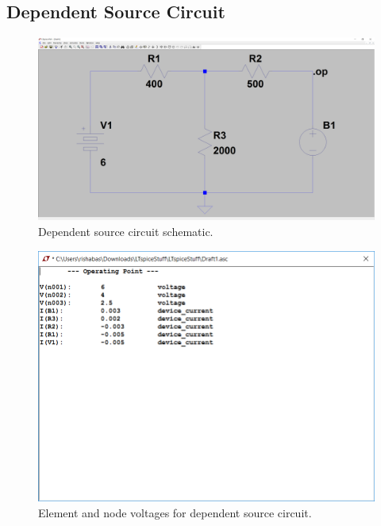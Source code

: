 \documentclass[10pt]{article}
\begin{document}
\subsection*{Dependent Source Circuit}
\begin{figure}[H]
	\centering
		\includegraphics[width=5in]{Capture2}
	\caption{Dependent source circuit schematic.}
\end{figure}
\begin{figure}[H]
	\centering
		\includegraphics[width=5in]{Capture3}
	\caption{Element and node voltages for dependent source circuit.}
\end{figure}
\end{document}

